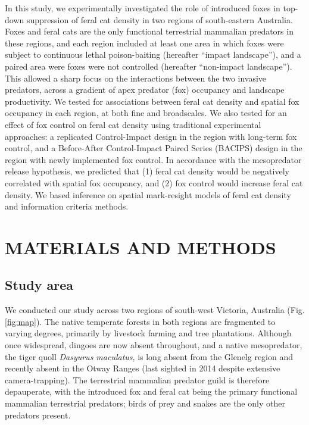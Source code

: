 \documentclass[]{elsarticle} %
\begin{document}
In this study, we experimentally investigated the role of introduced foxes in top-down suppression of feral cat density in two regions of south-eastern Australia.
Foxes and feral cats are the only functional terrestrial mammalian predators in these regions, and each region included at least one area in which foxes were subject to continuous lethal poison-baiting (hereafter ``impact landscape''), and a paired area were foxes were not controlled (hereafter ``non-impact landscape'').
This allowed a sharp focus on the interactions between the two invasive predators, across a gradient of apex predator (fox) occupancy and landscape productivity.
We tested for associations between feral cat density and spatial fox occupancy in each region, at both fine and broadscales.
We also tested for an effect of fox control on feral cat density using traditional experimental approaches: a replicated Control-Impact design in the region with long-term fox control, and a Before-After Control-Impact Paired Series (BACIPS) design in the region with newly implemented fox control.
In accordance with the mesopredator release hypothesis, we predicted that (1) feral cat density would be negatively correlated with spatial fox occupancy, and (2) fox control would increase feral cat density.
We based inference on spatial mark-resight models of feral cat density and information criteria methods.

\newpage

\hypertarget{materials-and-methods}{%
\section{MATERIALS AND METHODS}\label{materials-and-methods}}

\hypertarget{study-area}{%
\subsection{Study area}\label{study-area}}

We conducted our study across two regions of south-west Victoria, Australia (Fig. \ref{fig:map}).
The native temperate forests in both regions are fragmented to varying degrees, primarily by livestock farming and tree plantations.
Although once widespread, dingoes are now absent throughout, and a native mesopredator, the tiger quoll \emph{Dasyurus maculatus}, is long absent from the Glenelg region and recently absent in the Otway Ranges (last sighted in 2014 despite extensive camera-trapping).
The terrestrial mammalian predator guild is therefore depauperate, with the introduced fox and feral cat being the primary functional mammalian terrestrial predators; birds of prey and snakes are the only other predators present.
\end{document}
